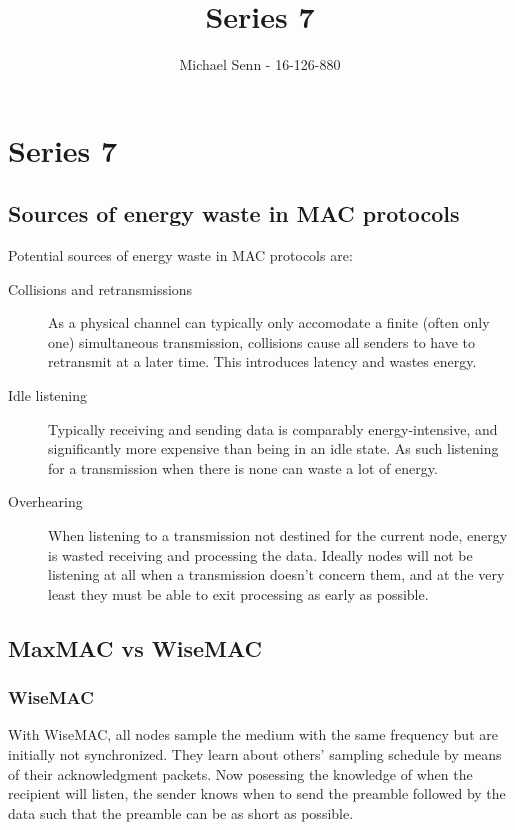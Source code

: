 \documentclass[a4paper]{scrreprt}
\title{Series 7}
\author{Michael Senn \maillink{michael.senn@students.unibe.ch} - 16-126-880}
\date{\printdate}
\begin{document}
\maketitle


\setcounter{chapter}{6}

\chapter{Series 7}

\section{Sources of energy waste in MAC protocols}

Potential sources of energy waste in MAC protocols are:

\begin{description}
		\item[Collisions and retransmissions] As a physical channel can
				typically only accomodate a finite (often only one)
				simultaneous transmission, collisions cause all senders to have
				to retransmit at a later time. This introduces latency and
				wastes energy.
		\item[Idle listening] Typically receiving and sending data is
				comparably energy-intensive, and significantly more expensive
				than being in an idle state. As such listening for a
				transmission when there is none can waste a lot of energy.
		\item[Overhearing] When listening to a transmission not destined for
				the current node, energy is wasted receiving and processing the
				data. Ideally nodes will not be listening at all when a
				transmission doesn't concern them, and at the very least they
				must be able to exit processing as early as possible.
\end{description}

\section{MaxMAC vs WiseMAC}

\subsection{WiseMAC}

With WiseMAC, all nodes sample the medium with the same frequency but are
initially not synchronized. They learn about others' sampling schedule by means
of their acknowledgment packets. Now posessing the knowledge of when the
recipient will listen, the sender knows when to send the preamble followed by
the data such that the preamble can be as short as possible.
\end{document}
